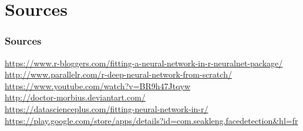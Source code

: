 \documentclass[compress]{beamer}
\begin{document}
\section*{Sources}
\begin{frame}
\frametitle{Sources}
	\url{https://www.r-bloggers.com/fitting-a-neural-network-in-r-neuralnet-package/}\\
	\url{http://www.parallelr.com/r-deep-neural-network-from-scratch/}\\
	\url{https://www.youtube.com/watch?v=BR9h47Jtqyw}\\
	\url{http://doctor-morbius.deviantart.com/}\\
	\url{https://datascienceplus.com/fitting-neural-network-in-r/}%
	\url{https://play.google.com/store/apps/details?id=com.seakleng.facedetection&hl=fr}
\end{frame}
\end{document}
